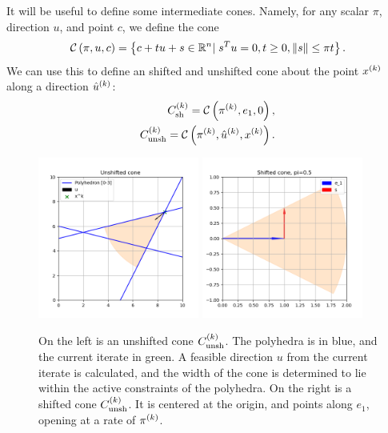 % 

It will be useful to define some intermediate cones.
Namely, for any scalar $\pi$, direction $u$, and point $c$, we define the cone
\begin{align}
\mathcal C\left(\pi, u, c\right) = \left\{c + t u + s \in \mathbb R^n | \; s^Tu= 0, t \ge 0, \|s\| \le \pi t\right\}.
\end{align}
We can use this to define an shifted and unshifted cone about the point $x^{(k)}$ along a direction ${{{\hat u}^{(k)}}}$:
\begin{align}
{C^{(k)}_{\textrm{sh}}} = \mathcal C\left(\pi^{(k)}, e_1, 0\right), \label{defineshiftedcone} \\
{C^{(k)}_{\textrm{unsh}}} = \mathcal C\left(\pi^{(k)}, {{{\hat u}^{(k)}}}, x^{(k)}\right). \label{defineunshiftedcone}
\end{align}


\begin{figure}[ht]
    \centering
    \includegraphics[width=200px]{images/unshifted_cone.png}
    \includegraphics[width=200px]{images/shifted_cone.png}
    \caption[An example of the shifted and unshifted cones]
	{
		On the left is an unshifted cone ${C^{(k)}_{\textrm{unsh}}}$.
		The polyhedra is in blue, and the current iterate in green.
		A feasible direction $u$ from the current iterate is calculated, and the width of the cone is determined to lie within the active constraints of the polyhedra.
		On the right is a shifted cone ${C^{(k)}_{\textrm{unsh}}}$.
		It is centered at the origin, and points along $e_1$, opening at a rate of $\pi^{(k)}$.
    }
    \label{linear_cones_images}
\end{figure}

